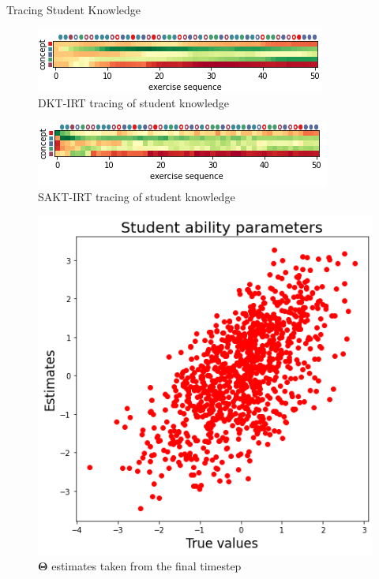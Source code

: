 \documentclass{beamer}
\newcommand{\vect}[1]{\boldsymbol{#1}}
\theoremstyle{definition}
\let\oldfootnotesize\footnotesize
\renewcommand*{\footnotesize}{\oldfootnotesize\tiny}
\begin{document}
\begin{frame}{Tracing Student Knowledge}
  \centering
\begin{figure}[h]
  \includegraphics[width=.97\textwidth]{../img/kt_irt/knowledge_trace_lstm_edited.png}
  \caption*{\footnotesize DKT-IRT tracing of student knowledge}
\end{figure}
  \medskip
\begin{figure}[h]
    \includegraphics[width=.97\textwidth]{../img/kt_irt/knowledge_trace_attn_edited.png}
    \caption*{\footnotesize SAKT-IRT tracing of student knowledge}
\end{figure}
  \endminipage
  \centering
  \begin{figure}
    \includegraphics[width=.9\textwidth]{../img/kt_irt/theta_est_attn2.png}
    \caption*{\centering \footnotesize $\vect \Theta$ estimates taken from the final timestep}
  \end{figure}
  \endminipage
\end{frame}
\end{document}
